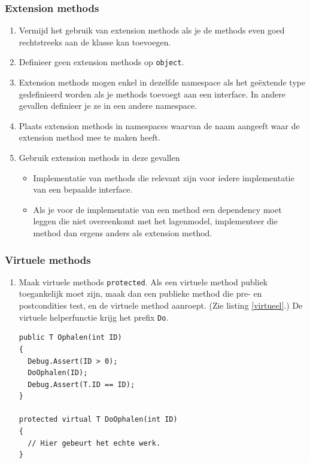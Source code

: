 \documentclass[a4paper,11pt]{article}
\begin{document}
\subsubsection{Extension methods}
\begin{enumerate}[resume]
\item Vermijd het gebruik van extension methods als je de methods even goed rechtstreeks aan de klasse kan toevoegen.
\item Definieer geen extension methods op \lstinline !object!.
\item Extension methods mogen enkel in dezelfde namespace als het
ge\"extende type gedefinieerd worden als je methods toevoegt aan een
interface.  In andere gevallen definieer je ze in een andere namespace.
\item Plaats extension methods in namespaces waarvan de naam aangeeft waar
de extension method mee te maken heeft.
\item Gebruik extension methods in deze gevallen
\begin{itemize}
\item Implementatie van methods die relevant zijn voor iedere
implementatie van een bepaalde interface.
\item Als je voor de implementatie van een method een dependency moet
leggen die niet overeenkomt met het lagenmodel, implementeer die method
dan ergens anders als extension method.
\end{itemize}
\end{enumerate}


\subsubsection{Virtuele methods}

\begin{enumerate}[resume]
\item Maak virtuele methods \lstinline !protected!.  Als een virtuele
method publiek toegankelijk moet zijn, maak dan een publieke
method die pre- en postcondities test, en de virtuele method aanroept.  (Zie
listing \ref{virtueel}.)  De virtuele helperfunctie krijg het prefix \lstinline !Do!.
\begin{lstlisting}[float,caption=Virtuele methods publiek
toegankelijk maken,label=virtueel]
public T Ophalen(int ID)
{
  Debug.Assert(ID > 0);
  DoOphalen(ID);
  Debug.Assert(T.ID == ID);
}

protected virtual T DoOphalen(int ID)
{
  // Hier gebeurt het echte werk.
}

\end{lstlisting}
\end{enumerate}
\end{document}
